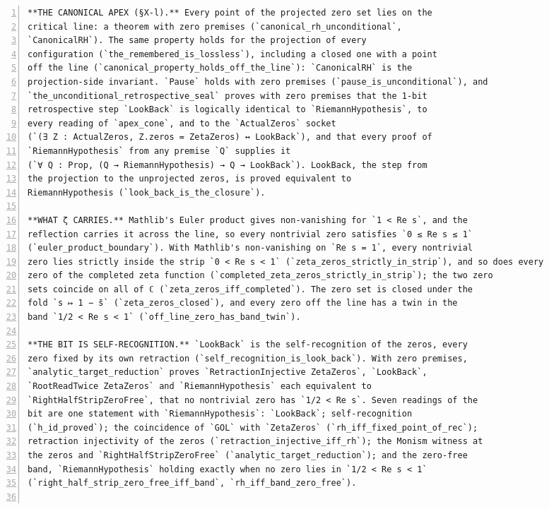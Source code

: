 \documentclass[10pt]{article}
\newcommand{\leansize}{\fontsize{5.5pt}{6.75pt}\selectfont}
\begin{document}
\begin{multicols}{2}
\begin{Verbatim}[numbers=left,firstnumber=1,numbersep=3pt,xleftmargin=2.6em,breaklines=true,breakanywhere=true,breakautoindent=false,breakindent=1.4em,breaksymbolleft={},breakanywheresymbolpre={},fontsize=\leansize]
**THE CANONICAL APEX (§X-l).** Every point of the projected zero set lies on the
critical line: a theorem with zero premises (`canonical_rh_unconditional`,
`CanonicalRH`). The same property holds for the projection of every
configuration (`the_remembered_is_lossless`), including a closed one with a point
off the line (`canonical_property_holds_off_the_line`): `CanonicalRH` is the
projection-side invariant. `Pause` holds with zero premises (`pause_is_unconditional`), and
`the_unconditional_retrospective_seal` proves with zero premises that the 1-bit
retrospective step `LookBack` is logically identical to `RiemannHypothesis`, to
every reading of `apex_cone`, and to the `ActualZeros` socket
(`(∃ Z : ActualZeros, Z.zeros = ZetaZeros) ↔ LookBack`), and that every proof of
`RiemannHypothesis` from any premise `Q` supplies it
(`∀ Q : Prop, (Q → RiemannHypothesis) → Q → LookBack`). LookBack, the step from
the projection to the unprojected zeros, is proved equivalent to
RiemannHypothesis (`look_back_is_the_closure`).

**WHAT ζ CARRIES.** Mathlib's Euler product gives non-vanishing for `1 < Re s`, and the
reflection carries it across the line, so every nontrivial zero satisfies `0 ≤ Re s ≤ 1`
(`euler_product_boundary`). With Mathlib's non-vanishing on `Re s = 1`, every nontrivial
zero lies strictly inside the strip `0 < Re s < 1` (`zeta_zeros_strictly_in_strip`), and so does every
zero of the completed zeta function (`completed_zeta_zeros_strictly_in_strip`); the two zero
sets coincide on all of ℂ (`zeta_zeros_iff_completed`). The zero set is closed under the
fold `s ↦ 1 − s̄` (`zeta_zeros_closed`), and every zero off the line has a twin in the
band `1/2 < Re s < 1` (`off_line_zero_has_band_twin`).

**THE BIT IS SELF-RECOGNITION.** `LookBack` is the self-recognition of the zeros, every
zero fixed by its own retraction (`self_recognition_is_look_back`). With zero premises,
`analytic_target_reduction` proves `RetractionInjective ZetaZeros`, `LookBack`,
`RootReadTwice ZetaZeros` and `RiemannHypothesis` each equivalent to
`RightHalfStripZeroFree`, that no nontrivial zero has `1/2 < Re s`. Seven readings of the
bit are one statement with `RiemannHypothesis`: `LookBack`; self-recognition
(`h_id_proved`); the coincidence of `GOL` with `ZetaZeros` (`rh_iff_fixed_point_of_rec`);
retraction injectivity of the zeros (`retraction_injective_iff_rh`); the Monism witness at
the zeros and `RightHalfStripZeroFree` (`analytic_target_reduction`); and the zero-free
band, `RiemannHypothesis` holding exactly when no zero lies in `1/2 < Re s < 1`
(`right_half_strip_zero_free_iff_band`, `rh_iff_band_zero_free`).


\end{Verbatim}
\end{multicols}
\end{document}
